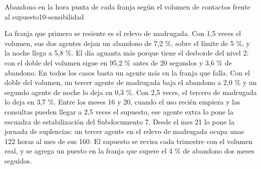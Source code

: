 \begin{figuraNativa}[!ht]{Abandono en la hora punta de cada franja según el volumen de contactos frente al supuesto}{10-sensibilidad}
\end{figuraNativa}

La franja que primero se resiente es el relevo de madrugada. Con 1,5 veces el volumen, sus dos agentes
dejan un abandono de 7,2 \%, sobre el límite de 5 \%, y la noche llega a 5,8 \%. El día aguanta más
porque tiene el desborde del nivel 2: con el doble del volumen sigue en 95,2 \% antes de 20 segundos y
3,6 \% de abandono. En todos los casos basta un agente más en la franja que falla. Con el doble del
volumen, un tercer agente de madrugada baja el abandono a 2,0 \% y un segundo agente de noche lo deja en
0,3 \%. Con 2,5 veces, el tercero de madrugada lo deja en 3,7 \%. Entre los meses 16 y 20, cuando el uso
recién empieza y las consultas pueden llegar a 2,5 veces el supuesto, ese agente extra lo pone la
escuadra de estabilización del Subdocumento 7. Desde el mes 21 lo pone la jornada de suplencias: un
tercer agente en el relevo de madrugada ocupa unas 122 horas al mes de sus 160. El supuesto se revisa
cada trimestre con el volumen real, y se agrega un puesto en la franja que supere el 4 \% de abandono
dos meses seguidos.


